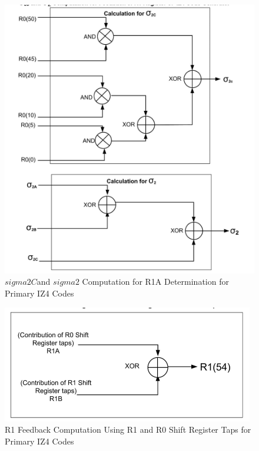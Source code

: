 \begin{figure}[h]
    \centering
    \includegraphics[width=\columnwidth]{figs/fig10.png}
    \captionsetup{justification=centering}
    \caption{$sigma2C$and $sigma2$ Computation for R1A Determination for Primary IZ4 Codes}
    \label{fig:sigma2C_and_sigma2_computation}
\end{figure}

\begin{figure}[h]
    \centering
    \includegraphics[width=\columnwidth]{figs/fig11.png}
    \captionsetup{justification=centering}
    \caption{R1 Feedback Computation Using R1 and R0 Shift Register Taps for Primary IZ4 Codes}
    \label{fig:R1Feedback}
\end{figure}





